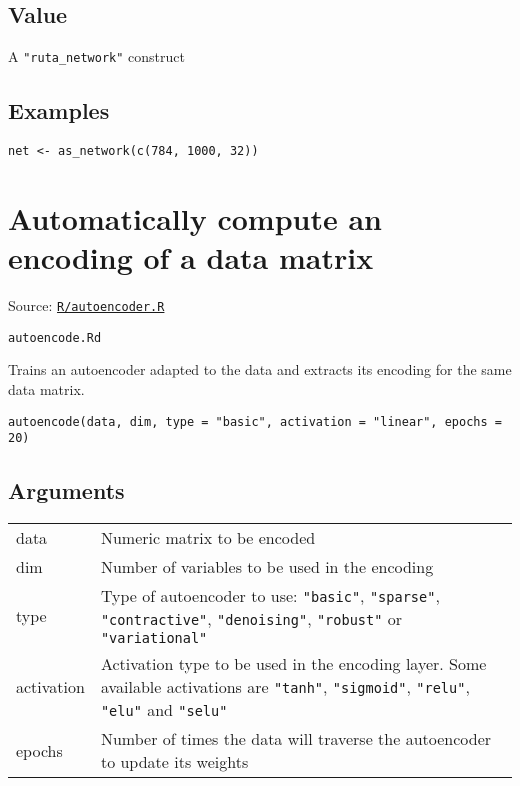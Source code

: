 \hypertarget{value}{\subsection{\texorpdfstring{\protect\hyperlink{value}{}Value}{Value}}\label{value}}

A \texttt{"ruta\_network"} construct

\hypertarget{examples}{\subsection{\texorpdfstring{\protect\hyperlink{examples}{}Examples}{Examples}}\label{examples}}

\begin{verbatim}
net <- as_network(c(784, 1000, 32))
\end{verbatim}

\section{Automatically compute an encoding of a data
matrix}\label{automatically-compute-an-encoding-of-a-data-matrix}

Source:
\href{https://github.com/fdavidcl/ruta/blob/master/R/autoencoder.R}{\texttt{R/autoencoder.R}}

\texttt{autoencode.Rd}

Trains an autoencoder adapted to the data and extracts its encoding for
the same data matrix.

\begin{verbatim}
autoencode(data, dim, type = "basic", activation = "linear", epochs = 20)
\end{verbatim}

\hypertarget{arguments}{\subsection{\texorpdfstring{\protect\hyperlink{arguments}{}Arguments}{Arguments}}\label{arguments}}

\begin{longtable}[c]{@{}ll@{}}
\toprule
data & Numeric matrix to be encoded\tabularnewline
dim & Number of variables to be used in the encoding\tabularnewline
type & Type of autoencoder to use: \texttt{"basic"}, \texttt{"sparse"},
\texttt{"contractive"}, \texttt{"denoising"}, \texttt{"robust"} or
\texttt{"variational"}\tabularnewline
activation & Activation type to be used in the encoding layer. Some
available activations are \texttt{"tanh"}, \texttt{"sigmoid"},
\texttt{"relu"}, \texttt{"elu"} and \texttt{"selu"}\tabularnewline
epochs & Number of times the data will traverse the autoencoder to
update its weights\tabularnewline
\bottomrule
\end{longtable}

